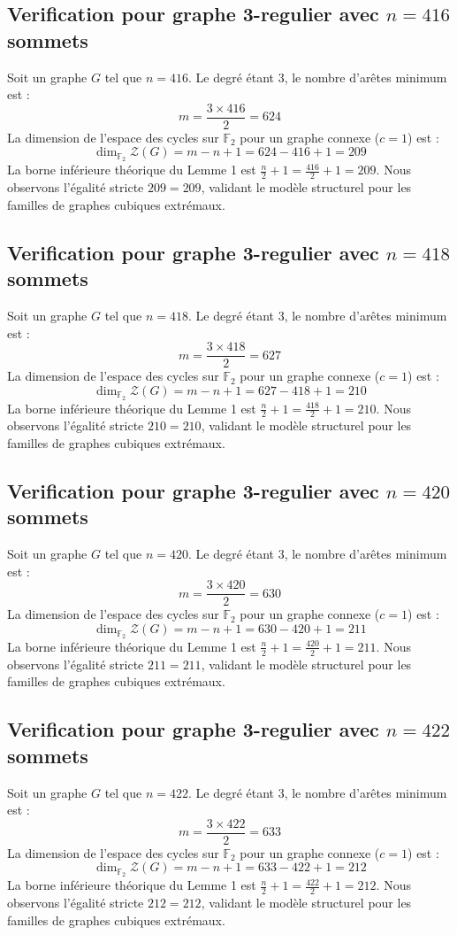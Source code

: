 \documentclass[11pt,a4paper]{article}
\begin{document}
\subsection{Verification pour graphe 3-regulier avec $n=416$ sommets}
Soit un graphe $G$ tel que $n = 416$. Le degré étant 3, le nombre d'arêtes minimum est :
$$ m = \frac{3 \times 416}{2} = 624 $$
La dimension de l'espace des cycles sur $\mathbb{F}_2$ pour un graphe connexe ($c=1$) est :
$$ \dim_{\mathbb{F}_2} \mathcal{Z}(G) = m - n + 1 = 624 - 416 + 1 = 209 $$
La borne inférieure théorique du Lemme 1 est $\frac{n}{2} + 1 = \frac{416}{2} + 1 = 209$.
Nous observons l'égalité stricte $209 = 209$, validant le modèle structurel pour les familles de graphes cubiques extrémaux.

\subsection{Verification pour graphe 3-regulier avec $n=418$ sommets}
Soit un graphe $G$ tel que $n = 418$. Le degré étant 3, le nombre d'arêtes minimum est :
$$ m = \frac{3 \times 418}{2} = 627 $$
La dimension de l'espace des cycles sur $\mathbb{F}_2$ pour un graphe connexe ($c=1$) est :
$$ \dim_{\mathbb{F}_2} \mathcal{Z}(G) = m - n + 1 = 627 - 418 + 1 = 210 $$
La borne inférieure théorique du Lemme 1 est $\frac{n}{2} + 1 = \frac{418}{2} + 1 = 210$.
Nous observons l'égalité stricte $210 = 210$, validant le modèle structurel pour les familles de graphes cubiques extrémaux.

\subsection{Verification pour graphe 3-regulier avec $n=420$ sommets}
Soit un graphe $G$ tel que $n = 420$. Le degré étant 3, le nombre d'arêtes minimum est :
$$ m = \frac{3 \times 420}{2} = 630 $$
La dimension de l'espace des cycles sur $\mathbb{F}_2$ pour un graphe connexe ($c=1$) est :
$$ \dim_{\mathbb{F}_2} \mathcal{Z}(G) = m - n + 1 = 630 - 420 + 1 = 211 $$
La borne inférieure théorique du Lemme 1 est $\frac{n}{2} + 1 = \frac{420}{2} + 1 = 211$.
Nous observons l'égalité stricte $211 = 211$, validant le modèle structurel pour les familles de graphes cubiques extrémaux.

\subsection{Verification pour graphe 3-regulier avec $n=422$ sommets}
Soit un graphe $G$ tel que $n = 422$. Le degré étant 3, le nombre d'arêtes minimum est :
$$ m = \frac{3 \times 422}{2} = 633 $$
La dimension de l'espace des cycles sur $\mathbb{F}_2$ pour un graphe connexe ($c=1$) est :
$$ \dim_{\mathbb{F}_2} \mathcal{Z}(G) = m - n + 1 = 633 - 422 + 1 = 212 $$
La borne inférieure théorique du Lemme 1 est $\frac{n}{2} + 1 = \frac{422}{2} + 1 = 212$.
Nous observons l'égalité stricte $212 = 212$, validant le modèle structurel pour les familles de graphes cubiques extrémaux.
\end{document}
